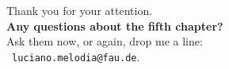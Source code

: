 \documentclass[aspectratio=169,t]{beamer}
\begin{document}
  { %
    \begin{frame}[c]
      \begin{center}
        Thank you for your attention.\\
        {\bf Any questions about the fifth chapter?}\\[0.5cm]
        Ask them now, or again, drop me a line: \\ 
        \faSendO \ \texttt{luciano.melodia@fau.de}.
      \end{center}
    \end{frame}
  }
\end{document}
